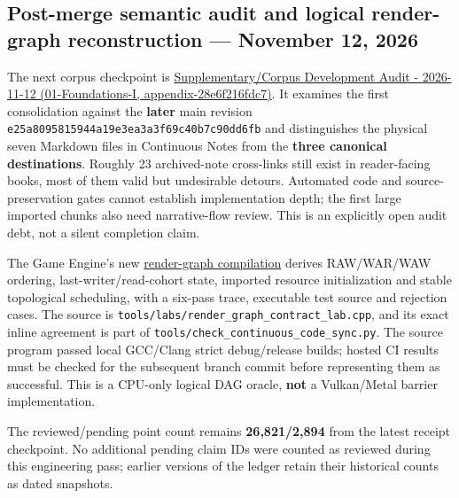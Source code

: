 \subsection{Post-merge semantic audit and logical render-graph reconstruction --- November 12, 2026}\label{appendix-3b67654799a2-post-merge-semantic-audit-and-logical-render-graph-reconstruction-november-12-2026}

The next corpus checkpoint is \href{../01-Foundations-I/main.pdf\#nameddest=appendix-28e6f216fdc7}{Supplementary/Corpus Development Audit - 2026-11-12 (01-Foundations-I, appendix-28e6f216fdc7)}. It examines the first consolidation against the \textbf{later} main revision \texttt{e25a8095815944a19e3ea3a3f69c40b7c90dd6fb} and distinguishes the physical seven Markdown files in Continuous Notes from the \textbf{three canonical destinations}. Roughly 23 archived-note cross-links still exist in reader-facing books, most of them valid but undesirable detours. Automated code and source-preservation gates cannot establish implementation depth; the first large imported chunks also need narrative-flow review. This is an explicitly open audit debt, not a silent completion claim.

The Game Engine's new \href{Continuous\%20Notes/Game\%20Engine\%20-\%20From\%20First\%20Frame\%20to\%20Living\%20Worlds\#From\%20a\%20list\%20of\%20render\%20passes\%20to\%20a\%20proved\%20execution\%20order}{render-graph compilation} derives RAW/WAR/WAW ordering, last-writer/read-cohort state, imported resource initialization and stable topological scheduling, with a six-pass trace, executable test source and rejection cases. The source is \texttt{tools/labs/render\_graph\_contract\_lab.cpp}, and its exact inline agreement is part of \texttt{tools/check\_continuous\_code\_sync.py}. The source program passed local GCC/Clang strict debug/release builds; hosted CI results must be checked for the subsequent branch commit before representing them as successful. This is a CPU-only logical DAG oracle, \textbf{not} a Vulkan/Metal barrier implementation.

The reviewed/pending point count remains \textbf{26,821/2,894} from the latest receipt checkpoint. No additional pending claim IDs were counted as reviewed during this engineering pass; earlier versions of the ledger retain their historical counts as dated snapshots.
